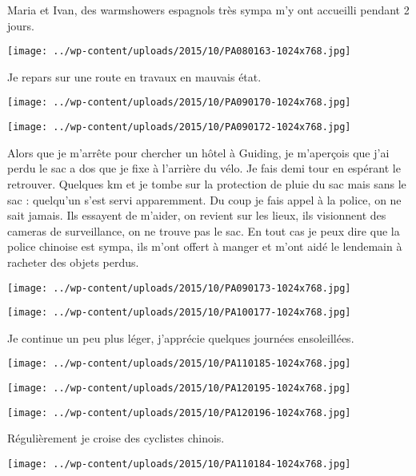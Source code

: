 \pagebreak
 Maria et Ivan, des warmshowers espagnols très sympa m'y ont accueilli pendant 2 jours. 
\begin{center} \texttt{[image: ../wp-content/uploads/2015/10/PA080163-1024x768.jpg]} \end{center}

 Je repars sur une route en travaux en mauvais état. 
\begin{center} \texttt{[image: ../wp-content/uploads/2015/10/PA090170-1024x768.jpg]} \end{center}
\begin{center} \texttt{[image: ../wp-content/uploads/2015/10/PA090172-1024x768.jpg]} \end{center}

 Alors que je m'arrête pour chercher un hôtel à Guiding, je m'aperçois que j'ai perdu le sac a dos que je fixe à l'arrière du vélo. Je fais demi tour en espérant le retrouver. Quelques km et je tombe sur la protection de pluie du sac mais sans le sac : quelqu'un s'est servi apparemment. 
 Du coup je fais appel à la police, on ne sait jamais. Ils essayent de m'aider, on revient sur les lieux, ils visionnent des cameras de surveillance, on ne trouve pas le sac. En tout cas je peux dire que la police chinoise est sympa, ils m'ont offert à manger et m'ont aidé le lendemain à racheter des objets perdus. 
\begin{center} \texttt{[image: ../wp-content/uploads/2015/10/PA090173-1024x768.jpg]} \end{center}
\begin{center} \texttt{[image: ../wp-content/uploads/2015/10/PA100177-1024x768.jpg]} \end{center}

 Je continue un peu plus léger, j'apprécie quelques journées ensoleillées. 
\begin{center} \texttt{[image: ../wp-content/uploads/2015/10/PA110185-1024x768.jpg]} \end{center}
\begin{center} \texttt{[image: ../wp-content/uploads/2015/10/PA120195-1024x768.jpg]} \end{center}
\begin{center} \texttt{[image: ../wp-content/uploads/2015/10/PA120196-1024x768.jpg]} \end{center}

\pagebreak
 Régulièrement je croise des cyclistes chinois. 
\begin{center} \texttt{[image: ../wp-content/uploads/2015/10/PA110184-1024x768.jpg]} \end{center}

